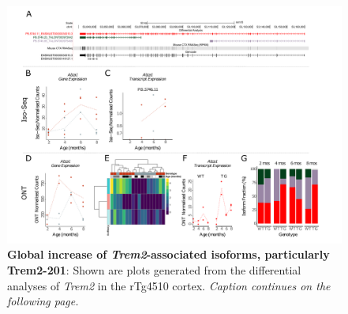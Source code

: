 \begin{landscape}
	\begin{figure}[htp]
		\begin{center}
			\includegraphics[page=18,trim={0 0.5cm 0 1.5cm},scale =0.85]{Figures/TargetGene_DifferentialAnalysis.pdf}
		\end{center}
		\captionsetup{width=1.5\textwidth}
		\caption[Differential \textit{Trem2} transcript expression from targeted profiling of rTg4510 mice]%
		{\textbf{Global increase of \textit{Trem2}-associated isoforms, particularly Trem2-201}: Shown are plots generated from the differential analyses of \textit{Trem2} in the rTg4510 cortex. \textit{Caption continues on the following page.}}   
		\label{fig:trem2_diff_analysis}
	\end{figure}
\end{landscape}
